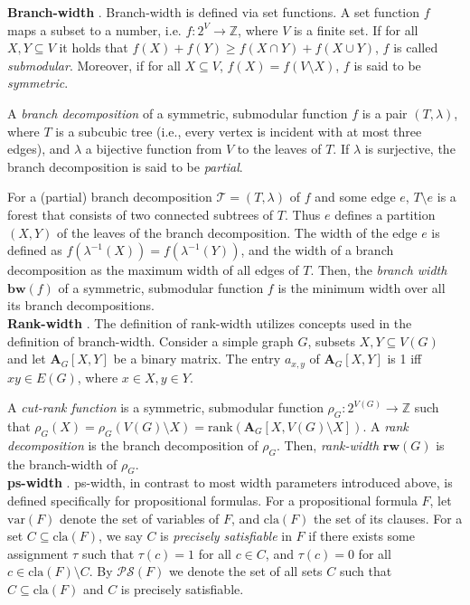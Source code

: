 \documentclass{article}
\begin{document}
\noindent
\textbf{Branch-width} \cite{DBLP:journals/jct/OumS06}.
Branch-width is defined via set functions.
A set function $f$ maps a subset to a number, i.e. $f : 2^V \rightarrow \mathbb{Z}$, where $V$ is a finite set.
If for all $X,Y \subseteq V$ it holds that $f(X)+f(Y) \geq f(X\cap Y) + f(X\cup Y)$, $f$ is called {\em submodular}.
Moreover, if for all $X\subseteq V$, $f(X) = f(V \setminus X)$, $f$ is said to be {\em symmetric}.

A {\em branch decomposition} of a symmetric, submodular function $f$ is a pair $(T, \lambda)$, where $T$ is a subcubic tree (i.e., every vertex is incident with at most three edges), and $\lambda$ a bijective function from $V$ to the leaves of $T$.
If $\lambda$ is surjective, the branch decomposition is said to be {\em partial}.

For a (partial) branch decomposition $\mathcal{T} = (T,\lambda)$ of $f$ and some edge $e$, $T \setminus e$ is a forest that consists of two connected subtrees of $T$.
Thus $e$ defines a partition $(X,Y)$ of the leaves of the branch decomposition.
The width of the edge $e$ is defined as $f(\lambda^{-1}(X)) = f(\lambda^{-1}(Y))$, and the width of a branch decomposition as the maximum width of all edges of $T$.
Then, the {\em branch width} $\mathbf{bw}(f)$ of a symmetric, submodular function $f$ is the minimum width over all its branch decompositions.\\

\noindent
\textbf{Rank-width} \cite{DBLP:journals/fuin/GanianHO13}.
The definition of rank-width utilizes concepts used in the definition of branch-width.
Consider a simple graph $G$, subsets $X,Y \subseteq V(G)$ and let $\mathbf{A}_G[X,Y]$ be a binary matrix.
The entry $a_{x,y}$ of $\mathbf{A}_G[X,Y]$ is 1 iff $xy \in E(G)$, where $x\in X, y\in Y$.

A {\em cut-rank function} is a symmetric, submodular function $\rho_G : 2^{V(G)} \rightarrow \mathbb{Z}$ such that $\rho_G(X)=\rho_G(V(G)\setminus X) = \text{rank}(\mathbf{A}_G[X, V(G)\setminus X])$.
A {\em rank decomposition} is the branch decomposition of $\rho_G$.
Then, {\em rank-width} $\textbf{rw}(G)$ is the branch-width of $\rho_G$. \\


\noindent
\textbf{ps-width} \cite{DBLP:conf/sat/SaetherTV14}.
ps-width, in contrast to most width parameters introduced above, is defined specifically for propositional formulas.
For a propositional formula $F$, let $\text{var}(F)$ denote the set of variables of $F$, and $\text{cla}(F)$ the set of its clauses.
For a set $C \subseteq \text{cla}(F)$, we say $C$ is {\em precisely satisfiable} in $F$ if there exists some assignment $\tau$ such that $\tau(c)=1$ for all $c\in C$, and $\tau(c)=0$ for all $c \in \text{cla}(F)\setminus C$.
By $\mathcal{PS}(F)$ we denote the set of all sets $C$ such that $C \subseteq \text{cla}(F)$ and $C$ is precisely satisfiable.
\end{document}
